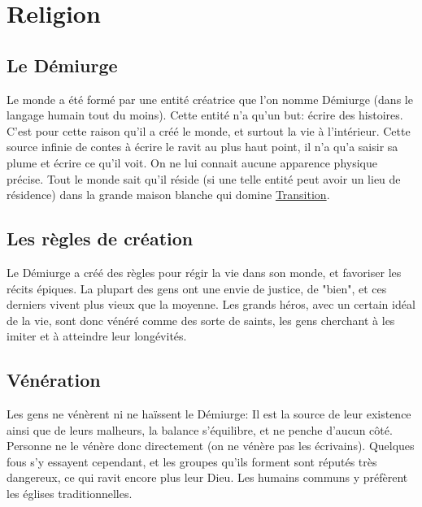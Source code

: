 
\section{Religion}
\subsection{Le Démiurge}
\hypertarget {demiurge}{}Le monde a été formé par une entité créatrice que l'on nomme Démiurge (dans le langage humain tout du moins). Cette entité n'a qu'un but: écrire des histoires. C'est pour cette raison qu'il a créé le monde, et surtout la vie à l’intérieur. Cette source infinie de contes à écrire le ravit au plus haut point, il n'a qu'a saisir sa plume et écrire ce qu'il voit. On ne lui connait aucune apparence physique précise. Tout le monde sait qu'il réside (si une telle entité peut avoir un lieu de résidence) dans la grande maison blanche qui domine \hyperlink{transition}{Transition}.
\subsection{Les règles de création}
Le Démiurge a créé des règles pour régir la vie dans son monde, et favoriser les récits épiques. La plupart des gens ont une envie de justice, de "bien", et ces derniers vivent plus vieux que la moyenne. Les grands héros, avec un certain idéal de la vie, sont donc vénéré comme des sorte de saints, les gens cherchant à les imiter et à atteindre leur longévités.
\subsection{Vénération}
Les gens ne vénèrent ni ne haïssent le Démiurge: Il est la source de leur existence ainsi que de leurs malheurs, la balance s'équilibre, et ne penche d'aucun côté. Personne ne le vénère donc directement (on ne vénère pas les écrivains). Quelques fous s'y essayent cependant, et les groupes qu'ils forment sont réputés très dangereux, ce qui ravit encore plus leur Dieu. Les humains communs y préfèrent les églises traditionnelles.
